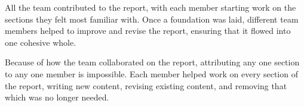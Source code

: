All the team contributed to the report, with each member starting work on the sections they felt most familiar with. Once a foundation was laid, different team members helped to improve and revise the report, ensuring that it flowed into one cohesive whole.

Because of how the team collaborated on the report, attributing any one section to any one member is impossible. Each member helped work on every section of the report, writing new content, revising existing content, and removing that which was no longer needed.

\clearpage
